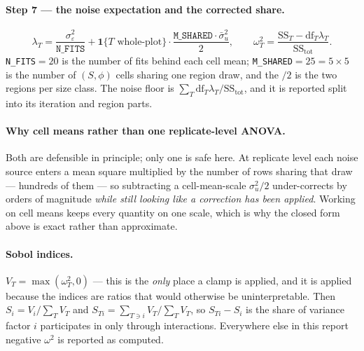 \paragraph{Step 7 --- the noise expectation and the corrected share.}
\[
\lambda_T=\frac{\sigma^2_\varepsilon}{\texttt{N\_FITS}}
+\mathbf{1}\{T\text{ whole-plot}\}\cdot\frac{\texttt{M\_SHARED}\cdot\bar\sigma^2_u}{2},
\qquad
\omega^2_T=\frac{\mathrm{SS}_T-\mathrm{df}_T\lambda_T}{\mathrm{SS}_{\text{tot}}} .
\]
\texttt{N\_FITS}$=20$ is the number of fits behind each cell mean;
\texttt{M\_SHARED}$=25=5\times5$ is the number of $(S,\phi)$ cells sharing one
region draw, and the $/2$ is the two regions per size class. The noise floor is
$\sum_T \mathrm{df}_T\lambda_T/\mathrm{SS}_{\text{tot}}$, and it is reported
split into its iteration and region parts.

\paragraph{Why cell means rather than one replicate-level ANOVA.}
Both are defensible in principle; only one is safe here. At replicate level each
noise source enters a mean square multiplied by the number of rows sharing that
draw --- hundreds of them --- so subtracting a cell-mean-scale $\sigma^2_u/2$
under-corrects by orders of magnitude \emph{while still looking like a
correction has been applied}. Working on cell means keeps every quantity on one
scale, which is why the closed form above is exact rather than approximate.

\paragraph{Sobol indices.}
$V_T=\max(\omega^2_T,0)$ --- this is the \emph{only} place a clamp is applied,
and it is applied because the indices are ratios that would otherwise be
uninterpretable. Then
$S_i = V_i/\sum_T V_T$ and $S_{Ti}=\sum_{T\ni i}V_T/\sum_T V_T$, so
$S_{Ti}-S_i$ is the share of variance factor $i$ participates in only through
interactions. Everywhere else in this report negative $\omega^2$ is reported as
computed.
